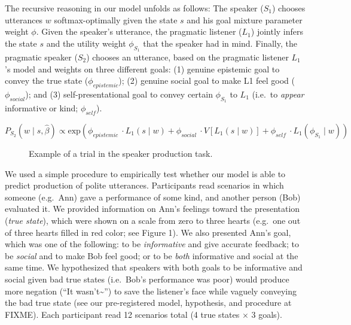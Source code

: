 \documentclass[12pt]{article}
\begin{document}
The recursive reasoning in our model unfolds as follows: 
The speaker (\(S_1\)) chooses utterances \(w\) softmax-optimally given the state \(s\) and his goal mixture parameter weight \(\phi\). 
Given the speaker's utterance, the pragmatic listener (\(L_1\)) jointly infers the state \(s\) and the utility weight \(\phi_{S_1}\) that the speaker had in mind. 
Finally, the pragmatic speaker (\(S_2\)) chooses an utterance, based on the pragmatic
listener \(L_1\)'s model and weights on three different goals: 
(1) genuine epistemic goal to convey the true state (\(\phi_{epistemic}\)); 
(2) genuine social goal to make L1 feel good (\(\phi_{social}\)); and
(3) self-presentational goal to convey certain \(\phi_{S_1}\) to \(L_1\) 
(i.e.~to \emph{appear} informative or kind; \(\phi_{self}\)). 

\[P_{S_2}(w \mid s, \hat{\beta})\propto 
\mathrm{exp}( \phi_{epistemic}\ \cdot L_1(s \mid w) +
\phi_{social}\ \cdot V[L_1(s \mid w)] + 
\phi_{self}\ \cdot L_1(\phi_{S_1} \mid w) )\]

\begin{figure}
\centering
\caption{\label{fig:screenshot}Example of a trial in the speaker production task.}
\end{figure}

We used a simple procedure to empirically test whether our model is able to predict production of polite utterances. 
Participants read scenarios in which someone (e.g.~Ann) gave a performance of some kind, 
and another person (Bob) evaluated it. 
We provided information on Ann's feelings toward the presentation (\emph{true state}), 
which were shown on a scale from zero to three hearts 
(e.g.~one out of three hearts filled in red color; see Figure 1). 
We also presented Ann's goal, which was one of the following: 
to be \emph{informative} and give accurate feedback; 
to be \emph{social} and to make Bob feel good; 
or to be \emph{both} informative and social at the same time. 
We hypothesized that speakers with both goals to be informative and social given bad true states (i.e.~Bob's performance was poor) would produce more negation (\enquote{It wasn't\textasciitilde{}}) to save the listener's face while vaguely conveying the bad true state 
(see our pre-registered model, hypothesis, and procedure at FIXME). 
Each participant read 12 scenarios total (4 true states \(\times\) 3 goals).
\end{document}
